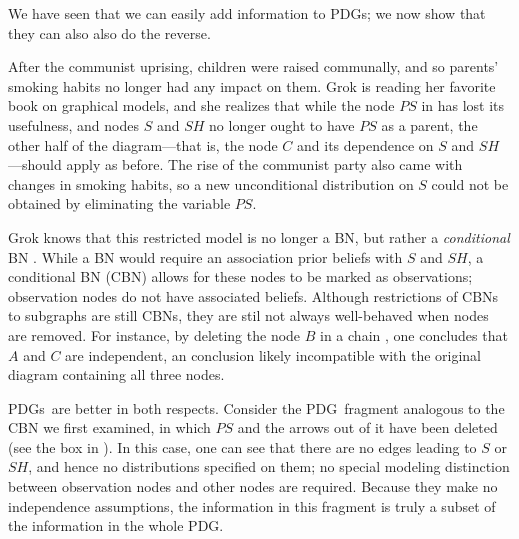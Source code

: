 \documentclass{article}
\newcommand{\MN}{PDG}
\newcommand{\MNs}{\MN s}
\numberwithin{equation}{section}
\begin{document}
	We have seen that we can easily add information to \MNs; we now show that they can also also do the reverse.  

	\begin{example}[restriction]\label{ex:grok-ablate}
		After the communist uprising, children were raised communally, and so parents' smoking habits no longer had any impact on them. Grok is reading her favorite book on graphical models, and she realizes that while the node $\mathit{PS}$ in  has lost its usefulness, and nodes $S$ and $\mathit{SH}$ no longer ought to have $\mathit{PS}$ as a parent, the other half of the diagram---that is, the node $C$ and its dependence on $S$ and $\mathit{SH}$---should apply as before.
		{\color{gray} The rise of the communist party also came with changes in smoking habits, so a new unconditional distribution on $S$ could not be obtained by eliminating the variable $PS$. }
		
		Grok knows that this restricted model is no longer a BN, but rather a \emph{conditional} BN \parencite{koller2009probabilistic}. While a BN would require an association prior beliefs with $S$ and $\mathit{SH}$, a conditional BN (CBN) allows for these nodes to be marked as observations; observation nodes do not have associated beliefs. 
		Although restrictions of CBNs to subgraphs are still CBNs, they are stil not always well-behaved when nodes are removed. For instance, by deleting the node $B$ in a chain 
		\scalebox{0.6}{
		\begin{tikzcd}[dpad={light pad}, column sep = 1.3em, AmpRep]
			A \ar[r] \& B \ar[r] \& C
		\end{tikzcd}},
		one concludes that $A$ and $C$ are independent, an conclusion likely incompatible with the original diagram containing all three nodes.  
		
		
		\MNs\ are better in both respects. Consider the \MN\ fragment analogous to the CBN we first examined, in which $\mathit{PS}$ and the arrows out of it have been deleted (see the box in ). In this case, one can see that there are no edges leading to $S$ or $\mathit{SH}$, and hence no distributions specified on them; no special modeling distinction between observation nodes and other nodes are required. 
		Because they make no independence assumptions, the information in this fragment is truly a subset of the information in the whole \MN. 		
	\end{example}
	
\end{document}
